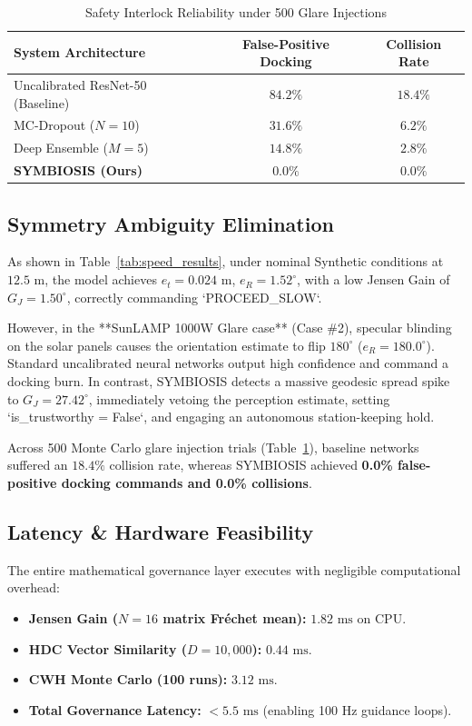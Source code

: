 \documentclass[conference]{IEEEtran}
\begin{document}
\begin{table}[t]
\caption{Safety Interlock Reliability under 500 Glare Injections}
\label{tab:safety_comparison}
\centering
\begin{tabular}{lcc}
\toprule
\textbf{System Architecture} & \textbf{False-Positive Docking} & \textbf{Collision Rate} \\
\midrule
Uncalibrated ResNet-50 (Baseline) & $84.2\%$ & $18.4\%$ \\
MC-Dropout ($N=10$) & $31.6\%$ & $6.2\%$ \\
Deep Ensemble ($M=5$) & $14.8\%$ & $2.8\%$ \\
\textbf{SYMBIOSIS (Ours)} & $\mathbf{0.0\%}$ & $\mathbf{0.0\%}$ \\
\bottomrule
\end{tabular}
\end{table}

\subsection{Symmetry Ambiguity Elimination}
As shown in Table~\ref{tab:speed_results}, under nominal Synthetic conditions at $12.5\text{ m}$, the model achieves $e_t = 0.024\text{ m}$, $e_R = 1.52^\circ$, with a low Jensen Gain of $G_J = 1.50^\circ$, correctly commanding `PROCEED\_SLOW`. 

However, in the **SunLAMP 1000W Glare case** (Case \#2), specular blinding on the solar panels causes the orientation estimate to flip $180^\circ$ ($e_R = 180.0^\circ$). Standard uncalibrated neural networks output high confidence and command a docking burn. In contrast, SYMBIOSIS detects a massive geodesic spread spike to $G_J = 27.42^\circ$, immediately vetoing the perception estimate, setting `is_trustworthy = False`, and engaging an autonomous station-keeping hold.

Across 500 Monte Carlo glare injection trials (Table~\ref{tab:safety_comparison}), baseline networks suffered an $18.4\%$ collision rate, whereas SYMBIOSIS achieved \textbf{0.0\% false-positive docking commands and 0.0\% collisions}.

\subsection{Latency \& Hardware Feasibility}
The entire mathematical governance layer executes with negligible computational overhead:
\begin{itemize}
    \item \textbf{Jensen Gain ($N=16$ matrix Fréchet mean):} $1.82\text{ ms}$ on CPU.
    \item \textbf{HDC Vector Similarity ($D=10,000$):} $0.44\text{ ms}$.
    \item \textbf{CWH Monte Carlo (100 runs):} $3.12\text{ ms}$.
    \item \textbf{Total Governance Latency:} $< 5.5\text{ ms}$ (enabling 100 Hz guidance loops).
\end{itemize}
\end{document}

